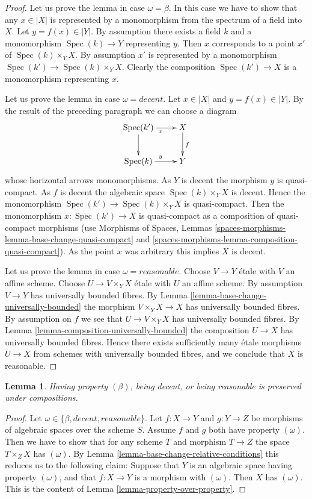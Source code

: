 \documentclass{stacks-project}
\theoremstyle{plain}
\newtheorem{lemma}[subsection]{Lemma}
\theoremstyle{definition}
\theoremstyle{remark}
\numberwithin{equation}{subsection}
\def\Spec{\mathop{\mathrm{Spec}}}
\begin{document}
\begin{proof}
Let us prove the lemma in case $\omega = \beta$. In this case we have to show
that any $x \in |X|$ is represented by a monomorphism from the spectrum
of a field into $X$. Let $y = f(x) \in |Y|$. By assumption there exists
a field $k$ and a monomorphism $\Spec(k) \to Y$ representing $y$.
Then $x$ corresponds to a point $x'$ of $\Spec(k) \times_Y X$.
By assumption $x'$ is represented by a monomorphism
$\Spec(k') \to \Spec(k) \times_Y X$. Clearly the composition
$\Spec(k') \to X$ is a monomorphism representing $x$.

\medskip\noindent
Let us prove the lemma in case $\omega = decent$.
Let $x \in |X|$ and $y = f(x) \in |Y|$. By the result of the preceding
paragraph we can choose a diagram
$$
\xymatrix{
\Spec(k') \ar[r]_x \ar[d] & X \ar[d]^f \\
\Spec(k) \ar[r]^y & Y
}
$$
whose horizontal arrows monomorphisms. As $Y$ is decent the morphism
$y$ is quasi-compact. As $f$ is decent the algebraic space
$\Spec(k) \times_Y X$ is decent. Hence the monomorphism
$\Spec(k') \to \Spec(k) \times_Y X$ is quasi-compact.
Then the monomorphism $x : \Spec(k') \to X$ is quasi-compact
as a composition of quasi-compact morphisms (use
Morphisms of Spaces, Lemmas
\ref{spaces-morphisms-lemma-base-change-quasi-compact} and
\ref{spaces-morphisms-lemma-composition-quasi-compact}).
As the point $x$ was arbitrary this implies $X$ is decent.

\medskip\noindent
Let us prove the lemma in case $\omega = reasonable$.
Choose $V \to Y$ \'etale with $V$ an affine scheme.
Choose $U \to V \times_Y X$ \'etale with $U$ an affine scheme.
By assumption $V \to Y$ has universally bounded fibres. By
Lemma \ref{lemma-base-change-universally-bounded}
the morphism $V \times_Y X \to X$ has universally bounded fibres.
By assumption on $f$ we see that $U \to V \times_Y X$ has
universally bounded fibres. By
Lemma \ref{lemma-composition-universally-bounded}
the composition $U \to X$ has universally bounded fibres.
Hence there exists sufficiently many \'etale morphisms $U \to X$
from schemes with universally bounded fibres, and we conclude
that $X$ is reasonable.
\end{proof}

\begin{lemma}
\label{lemma-composition-relative-conditions}
Having property $(\beta)$, being decent, or being reasonable
is preserved under compositions.
\end{lemma}

\begin{proof}
Let $\omega \in \{\beta, decent, reasonable\}$.
Let $f : X \to Y$ and $g : Y \to Z$ be morphisms of algebraic spaces
over the scheme $S$. Assume $f$ and $g$ both have property
$(\omega)$. Then we have to show
that for any scheme $T$ and morphism $T \to Z$ the space $T \times_Z X$
has $(\omega)$. By
Lemma \ref{lemma-base-change-relative-conditions}
this reduces us to the following claim: Suppose that $Y$ is an algebraic
space having property $(\omega)$, and that $f : X \to Y$ is a morphism
with $(\omega)$. Then $X$ has $(\omega)$.
This is the content of Lemma \ref{lemma-property-over-property}.
\end{proof}
\end{document}
